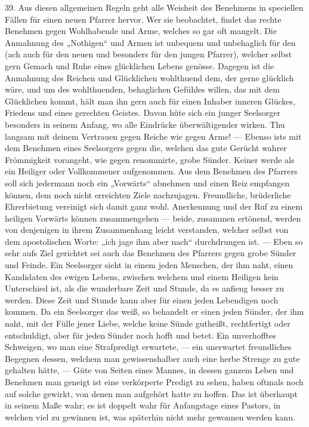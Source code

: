 39. Aus diesen allgemeinen Regeln geht alle Weisheit des Benehmens in speciellen Fällen für einen neuen Pfarrer hervor. Wer sie beobachtet, findet das rechte Benehmen gegen Wohlhabende und Arme, welches so gar oft mangelt. Die Anmahnung des „Nothigen“ und Armen ist unbequem und unbehaglich für den (ach auch für den neuen und besonders für den jungen Pfarrer), welcher selbst gern Gemach und Ruhe eines glücklichen Lebens genösse. Dagegen ist die Anmahnung des Reichen und Glücklichen wohlthuend dem, der gerne glücklich wäre, und um des wohlthuenden, behaglichen Gefühles willen, das mit dem Glücklichen kommt, hält man ihn gern auch für einen Inhaber inneren Glückes, Friedens und eines gerechten Geistes. Davon hüte sich ein junger Seelsorger besonders in seinem Anfang, wo alle Eindrücke überwältigender wirken. Thu langsam mit deinem Vertrauen gegen Reiche wie gegen Arme! — Ebenso ists mit dem Benehmen eines Seelsorgers gegen die, welchen das gute Gerücht wahrer Frömmigkeit vorangeht, wie gegen renommirte, grobe Sünder. Keiner werde als ein Heiliger oder Vollkommener aufgenommen. Aus dem Benehmen des Pfarrers soll sich jedermann noch ein „Vorwärts“ abnehmen und einen Reiz empfangen können, dem noch nicht erreichten Ziele nachzujagen. Freundliche,
brüderliche Ehrerbietung vereinigt sich damit ganz wohl. Anerkennung und der Ruf zu einem heiligen Vorwärts können zusammengehen — beide, zusammen ertönend, werden von denjenigen in ihrem Zusammenhang leicht verstanden, welcher selbst von dem apostolischen Worte: „ich jage ihm aber nach“ durchdrungen ist. — Eben so sehr aufs Ziel gerichtet sei auch das Benehmen des Pfarrers gegen grobe Sünder und Feinde. Ein Seelsorger sieht in einem jeden Menschen, der ihm naht, einen Kandidaten des ewigen Lebens, zwischen welchem und einem Heiligen kein Unterschied ist, als die wunderbare Zeit und Stunde, da es anfieng besser zu werden. Diese Zeit und Stunde kann aber für einen jeden Lebendigen noch kommen. Da ein Seelsorger das weiß, so behandelt er einen jeden Sünder, der ihm naht, mit der Fülle jener Liebe, welche keine Sünde gutheißt, rechtfertigt oder entschuldigt, aber für jeden Sünder noch hofft und betet. Ein unverhofftes Schweigen, wo man eine Strafpredigt erwartete, — ein unerwartet freundliches Begegnen dessen, welchem man gewissenshalber auch eine herbe Strenge zu gute gehalten hätte, — Güte von Seiten eines Mannes, in dessen ganzem Leben und Benehmen man geneigt ist eine verkörperte Predigt zu sehen, haben oftmals noch auf solche gewirkt, von denen man aufgehört hatte zu hoffen. Das ist überhaupt in seinem Maße wahr; es ist doppelt wahr für Anfangstage eines Pastors, in welchen viel zu gewinnen ist, was späterhin nicht mehr gewonnen werden kann.

